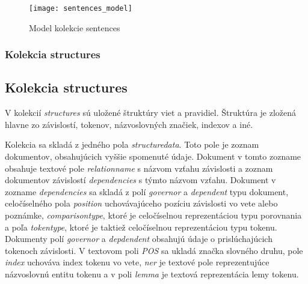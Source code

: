 \begin{figure}[H]
	\begin{center}\texttt{[image: sentences\_model]}\end{center}
	\caption[Model kolekcie sentences]{Model kolekcie sentences}\label{fig:sentences_collection_model}
\end{figure}

%
%
{
	\subsubsection{Kolekcia structures}
}
{
	\subsection{Kolekcia structures}
}
\label{subsubsection:collection_structures}
V kolekcií \textit{structures} sú uložené štruktúry viet a pravidiel. Štruktúra je zložená hlavne zo závislostí, tokenov, názvoslovných značiek, indexov a iné.

Kolekcia sa skladá z jedného pola \textit{structure\textunderscore data}. Toto pole je zoznam dokumentov, obsahujúcich vyššie spomenuté údaje. Dokument v tomto zozname obsahuje textové pole \textit{relation\textunderscore name} s názvom vzťahu závislosti a zoznam dokumentov závislostí \textit{dependencies} s týmto názvom vzťahu. Dokument v zozname \textit{dependencies} sa skladá z polí \textit{governor} a \textit{dependent} typu dokument, celočíselného pola \textit{position} uchovávajúceho pozíciu závislosti vo vete alebo poznámke, \textit{comparison\textunderscore type}, ktoré je celočíselnou reprezentáciou typu porovnania a poľa \textit{token\textunderscore type}, ktoré je taktiež celočíselnou reprezentáciou typu tokenu. Dokumenty polí \textit{governor} a \textit{depdendent} obsahujú údaje o prislúchajúcich tokenoch závislosti. V textovom poli \textit{POS} sa ukladá značka slovného druhu, pole \textit{index} uchováva index tokenu vo vete, \textit{ner} je textové pole reprezentujúce názvoslovnú entitu tokenu a v poli \textit{lemma} je textová reprezentácia lemy tokenu.

